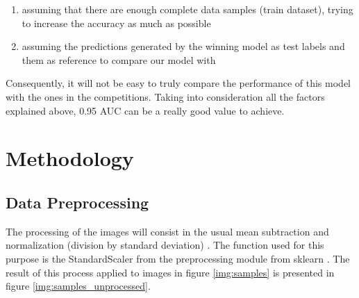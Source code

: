 \documentclass[]{article}
\begin{document}
\begin{enumerate}
	\item assuming that there are enough complete data samples (train dataset), trying to increase the accuracy as much as possible
	\item assuming the predictions generated by the winning model as test labels and them as reference to compare our model with
\end{enumerate}

Consequently, it will not be easy to truly compare the performance 
of this model with the ones in the competitions. Taking into consideration all the factors explained above, 0.95 AUC can be a really good value to achieve.

\section{Methodology}\label{iii.-methodology}

\subsection{Data Preprocessing}\label{data-preprocessing}

The processing of the images will consist in the usual mean subtraction and normalization (division by standard deviation) \cite{cs231preprocessing}. The function used for this purpose is the StandardScaler from the preprocessing module from sklearn \cite{sklearn_standard_scaler}. The result of this process applied to images in figure \ref{img:samples} is presented in figure \ref{img:samples_unprocessed}. 
\end{document}
